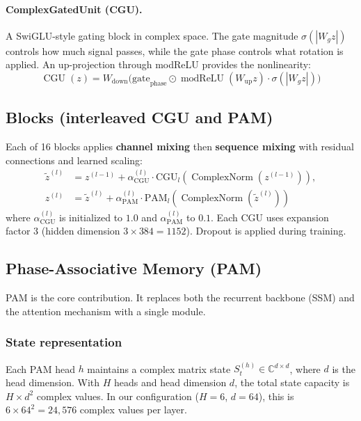 \documentclass[11pt]{article}
\newcommand{\Complex}{\mathbb{C}}
\begin{document}
\paragraph{ComplexGatedUnit (CGU).} A SwiGLU-style gating block in complex space. The gate magnitude $\sigma(|W_g z|)$ controls how much signal passes, while the gate phase controls what rotation is applied. An up-projection through modReLU provides the nonlinearity:
\begin{equation}
  \operatorname{CGU}(z) = W_{\text{down}}\bigl( \mathrm{gate}_{\mathrm{phase}} \odot \operatorname{modReLU}(W_{\text{up}} z) \cdot \sigma(|W_g z|) \bigr)
\end{equation}

\subsection{Blocks (interleaved CGU and PAM)}
\label{sec:blocks}
Each of 16 blocks applies \textbf{channel mixing} then \textbf{sequence mixing} with residual connections and learned scaling:
\begin{align}
  \tilde{z}^{(l)} &= z^{(l-1)} + \alpha^{(l)}_{\text{CGU}} \cdot \text{CGU}_l(\operatorname{ComplexNorm}(z^{(l-1)})), \\
  z^{(l)} &= \tilde{z}^{(l)} + \alpha^{(l)}_{\text{PAM}} \cdot \text{PAM}_l(\operatorname{ComplexNorm}(\tilde{z}^{(l)}))
\end{align}
where $\alpha^{(l)}_{\text{CGU}}$ is initialized to $1.0$ and $\alpha^{(l)}_{\text{PAM}}$ to $0.1$. Each CGU uses expansion factor 3 (hidden dimension $3 \times 384 = 1152$). Dropout is applied during training.

\subsection{Phase-Associative Memory (PAM)}
\label{sec:pam}
PAM is the core contribution. It replaces both the recurrent backbone (SSM) and the attention mechanism with a single module.

\subsubsection{State representation}
Each PAM head $h$ maintains a complex matrix state $S_t^{(h)} \in \Complex^{d \times d}$, where $d$ is the head dimension. With $H$ heads and head dimension $d$, the total state capacity is $H \times d^2$ complex values. In our configuration ($H = 6$, $d = 64$), this is $6 \times 64^2 = 24{,}576$ complex values per layer.
\end{document}
